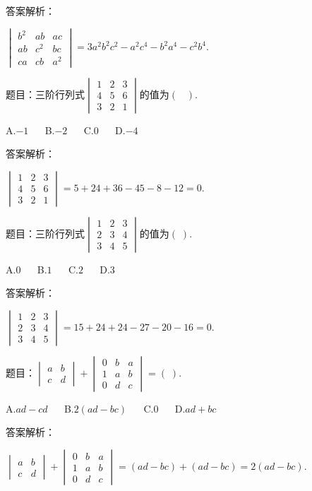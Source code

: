 答案解析：

$\begin{vmatrix}b^2&ab&ac\\ab&c^2&bc\\ca&cb&a^2\end{vmatrix}=3a^2b^2c^2-a^2c^4-b^2a^4-c^2b^4.$



题目：$\mathrm{三阶行列式}\begin{vmatrix}1&2&3\\4&5&6\\3&2&1\end{vmatrix}\mathrm{的值为}(\;\;\;).$

A.$-1$ $\quad$ B.$-2$ $\quad$ C.$0$ $\quad$ D.$-4$

答案解析：

$\begin{vmatrix}1&2&3\\4&5&6\\3&2&1\end{vmatrix}=5+24+36-45-8-12=0.$



题目：$\mathrm{三阶行列式}\begin{vmatrix}1&2&3\\2&3&4\\3&4&5\end{vmatrix}\mathrm{的值为}(\;).$

A.$0$ $\quad$ B.$1$ $\quad$ C.$2$ $\quad$ D.$3$

答案解析：

$\begin{vmatrix}1&2&3\\2&3&4\\3&4&5\end{vmatrix}=15+24+24-27-20-16=0.$



题目：$\begin{vmatrix}a&b\\c&d\end{vmatrix}+\begin{vmatrix}0&b&a\\1&a&b\\0&d&c\end{vmatrix}=(\;).$

A.$ad-cd$ $\quad$ B.$2(ad-bc)$ $\quad$ C.$0$ $\quad$ D.$ad+bc$

答案解析：

$\begin{vmatrix}a&b\\c&d\end{vmatrix}+\begin{vmatrix}0&b&a\\1&a&b\\0&d&c\end{vmatrix}=(ad-bc)+(ad-bc)=2(ad-bc).$



